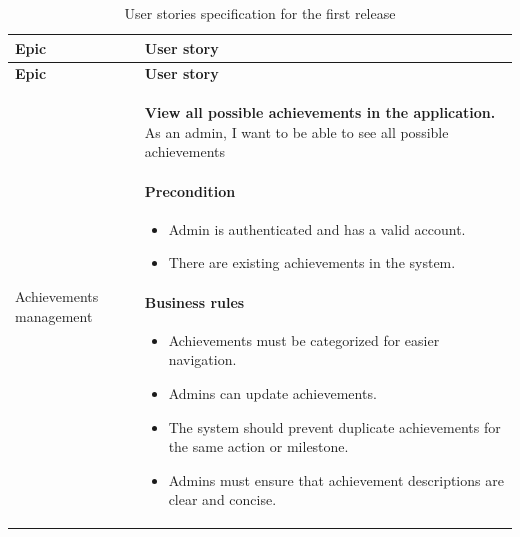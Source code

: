 \begin{longtable}{ | m{} | m{} | }
    \caption{User stories specification for the first release}                                                                                                                                                                                  \\
    \hline
    \textbf{Epic}                                       & \textbf{User story}                                                                                                                                                                    \\
    \hline
    \endfirsthead
    \hline
    \textbf{Epic}                                       & \textbf{User story}                                                                                                                                                                    \\
    \hline
    \endhead
    \endfoot
    \endlastfoot
    Achievements \newline management & \textbf{View all possible achievements in the application.} \newline As an admin, I want to be able to see all possible achievements

    \paragraph*{Precondition} \mbox{} \newline
    \begin{itemize}
        \item Admin is authenticated and has a valid account.
        \item There are existing achievements in the system.
    \end{itemize}

    \paragraph*{Business rules} \mbox{} \newline
    \begin{itemize}
        \item Achievements must be categorized for easier navigation.
        \item Admins can  update achievements.
        \item The system should prevent duplicate achievements for the same action or milestone.
        \item Admins must ensure that achievement descriptions are clear and concise.


\end{itemize}
\end{longtable}
